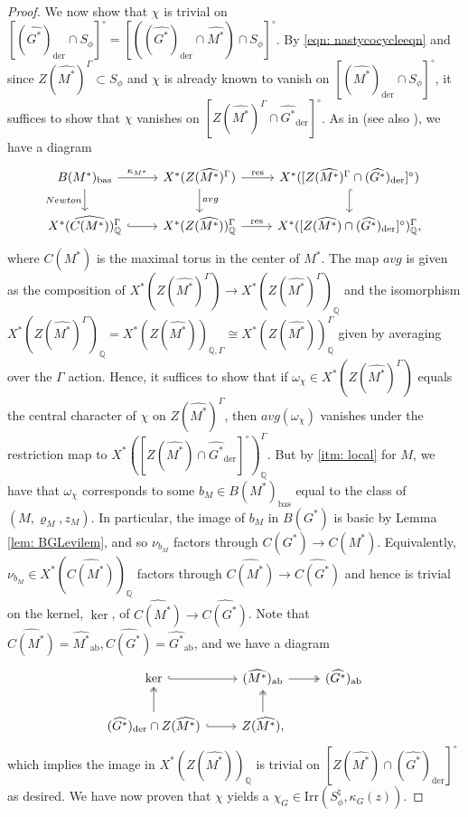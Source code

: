 \documentclass[reqno,11pt]{amsart}
\theoremstyle{remark}
\newcommand{\Irr}{\mathrm{Irr}}
\newcommand{\Q}{\mathbb{Q}}
\newcommand{\der}{\mathrm{der}}
\newcommand{\bas}{\mathrm{bas}}
\newcommand{\ab}{\mathrm{ab}}
\newcommand{\res}{\mathrm{res}}
\begin{document}
\begin{proof}
We now show that $\chi$ is trivial on $[(\widehat{G^*})_{\der} \cap S_{\phi}]^{\circ} = [((\widehat{G^*})_{\der} \cap \widehat{M^*}) \cap S_{\phi}]^{\circ}$. By \eqref{eqn: nastycocycleeqn} and since $Z(\widehat{M^*})^{\Gamma} \subset S_{\phi}$ and $\chi$ is already known to vanish on $[(\widehat{M^*})_{\der} \cap S_{\phi}]^{\circ}$, it suffices to show that $\chi$ vanishes on $[Z(\widehat{M^*})^{\Gamma} \cap \widehat{G^*}_{\der}]^{\circ}$. As in \cite[1.4.3]{KottwitzGlobal} (see also \cite[Theorem 1.15]{RapoportRichartz}), we have a diagram
\begin{equation}{\label{eqn: BMdiagram}}
    \begin{tikzcd}
            B(M^*)_{\bas} \arrow[r, "\kappa_{M^*}"] \arrow[d, swap, "Newton"] & X^*(Z(\widehat{M^*})^{\Gamma}) \arrow[d, "avg"] \arrow[r, "\res"] & X^*([Z(\widehat{M^*})^{\Gamma}  \cap (\widehat{G^*})_{\der}]^{\circ}) \arrow[d, hook] \\
            X^*(\widehat{C(M^*)})^{\Gamma}_{\Q} \arrow[r, hook] & X^*(Z(\widehat{M^*}))^{\Gamma}_{\Q} \arrow[r, "\res"]  & X^*([Z(\widehat{M^*}) \cap (\widehat{G^*})_{\der}]^{\circ})^{\Gamma}_{\Q},
    \end{tikzcd}
\end{equation}
where $C(M^*)$ is the maximal torus in the center of $M^*$. The map $avg$ is given as the composition of $X^*(Z(\widehat{M^*})^{\Gamma}) \to X^*(Z(\widehat{M^*})^{\Gamma})_{\Q}$ and the isomorphism $X^*(Z(\widehat{M^*})^{\Gamma})_{\Q} = X^*(Z(\widehat{M^*}))_{\Q, \Gamma} \cong X^*(Z(\widehat{M^*}))^{\Gamma}_{\Q}$ given by averaging over the $\Gamma$ action. Hence, it suffices to show that if $\omega_{\chi} \in X^*(Z(\widehat{M^*})^{\Gamma})$ equals the central character of $\chi$ on $Z(\widehat{M^*})^{\Gamma}$, then $avg(\omega_{\chi})$ vanishes under the restriction map to $X^*([Z(\widehat{M^*}) \cap \widehat{G^*}_{\der}]^{\circ})^{\Gamma}_{\Q}$. But by \ref{itm: local} for $M$, we have that $\omega_{\chi}$ corresponds to some $b_M \in B(M^*)_{\bas}$ equal to the class of $(M, \varrho_M, z_M)$. In particular, the image of $b_M$ in $B(G^*)$ is basic by Lemma \ref{lem: BGLevilem}, and so $\nu_{b_M}$ factors through $C(G^*) \to C(M^*)$. Equivalently, $\nu_{b_M} \in X^*(\widehat{C(M^*)})_{\Q}$  factors through $\widehat{C(M^*)} \to \widehat{C(G^*)}$ and hence is trivial on the kernel, $\ker$, of $\widehat{C(M^*)} \to \widehat{C(G^*)}$. Note that $\widehat{C(M^*)}=\widehat{M^*}_{\ab}, \widehat{C(G^*)}=\widehat{G^*}_{\ab}$, and we have a diagram
\begin{equation*}
\begin{tikzcd}
             \ker \arrow[r, hook] &(\widehat{M^*})_{\ab} \arrow[r, two heads] & (\widehat{G^*})_{\ab} \\
           (\widehat{G^*})_{\der} \cap Z(\widehat{M^*}) \arrow[u, two heads] \arrow[r, hook] & Z(\widehat{M^*}) \arrow[u, two heads], & 
\end{tikzcd}    
\end{equation*}
which implies the image in $X^*(Z(\widehat{M^*}))_{\Q}$ is trivial on $[Z(\widehat{M^*}) \cap (\widehat{G^*})_{\der}]^{\circ}$ as desired. We have now proven that $\chi$ yields a $\chi_G \in \Irr(S^{\natural}_{\phi}, \kappa_G(z))$.


\end{proof}
\end{document}
